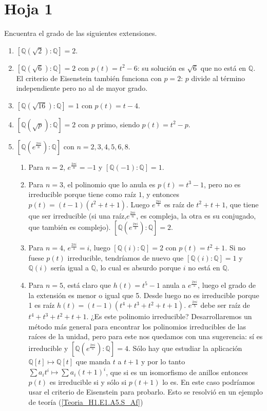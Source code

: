\section{Hoja 1}

\begin{problem} Encuentra el grado de las siguientes extensiones.
\solution
\begin{enumerate}
\item $[ℚ(\sqrt{2}) : ℚ ]= 2$.
\item $[ℚ(\sqrt{6}) : ℚ ]= 2$ con $p(t) = t^2 - 6$: su solución es $\sqrt{6}$ que no está en $ℚ$. El criterio de Eisenstein también funciona con $p=2$: $p$ divide al término independiente pero no al de mayor grado.
\item $[ℚ(\sqrt{16}) : ℚ ]= 1$ con $p(t) = t-4$.
\item $[ℚ(\sqrt{p}) : ℚ] = 2$ con $p$ primo, siendo $p(t) = t^2 - p$.
\item $[ℚ\left(e^{\frac{2πi}{n}}\right) : ℚ]$ con $n=2,3,4,5,6,8$.
\begin{enumerate}
\item Para $n=2$, $e^{\frac{2πi}{n}} = -1$ y $[ℚ(-1):ℚ] =  1$.

\item Para $n=3$, el polinomio que lo anula es $p(t) = t^3 - 1$, pero no es irreducible porque tiene como raíz $1$, y entonces $p(t) = (t-1) (t^2 + t + 1)$. Luego $e^{\frac{2πi}{3}}$ es raíz de $t^2+t+1$, que tiene que ser irreducible (si una raíz,$e^{\frac{2πi}{n}}$, es compleja, la otra es su conjugado, que también es complejo). $[ℚ\left(e^{\frac{2πi}{3}}\right) : ℚ] = 2$.

\item Para $n=4$, $e^{\frac{2πi}{4}} = i$, luego $[ℚ(i) : ℚ ] = 2$ con $p(t) = t^2 + 1$. Si no fuese $p(t)$ irreducible, tendríamos de nuevo que $[ℚ(i) : ℚ]=1$ y $ℚ(i)$ sería igual a $ℚ$, lo cual es absurdo porque $i$ no está en $ℚ$.

\item Para $n=5$, está claro que $h(t) = t^5 - 1$ anula a $e^{\frac{2πi}{5}}$, luego el grado de la extensión es menor o igual que 5. Desde luego no es irreducible porque 1 es raíz $h(t) = (t-1)(t^4 + t^3 + t^2 + t + 1)$. $e^{\frac{2πi}{5}}$ debe ser raíz de $t^4 + t^3 + t^2 + t + 1$. ¿Es este polinomio irreducible? Desarrollaremos un método más general para encontrar los polinomios irreducibles de las raíces de la unidad, pero para este nos quedamos con una sugerencia: sí es irreducible y $[ℚ\left(e^{\frac{2πi}{5}}\right): ℚ ] = 4$. Sólo hay que estudiar la aplicación $ℚ[t] \mapsto ℚ[t]$ que manda $t$ a $t+1$ y por lo tanto $\sum a_i t^i \mapsto \sum a_i (t+1)^i$, que si es un isomorfismo de anillos entonces $p(t)$ es irreducible si y sólo si $p(t+1)$ lo es. En este caso podríamos usar el criterio de Eisenstein para probarlo. Esto se resolvi\'o en un ejemplo de teor\'ia (\ref{Teoria_H1.E1.A5.S_Af})


\end{enumerate}
\end{enumerate}
\end{problem}
